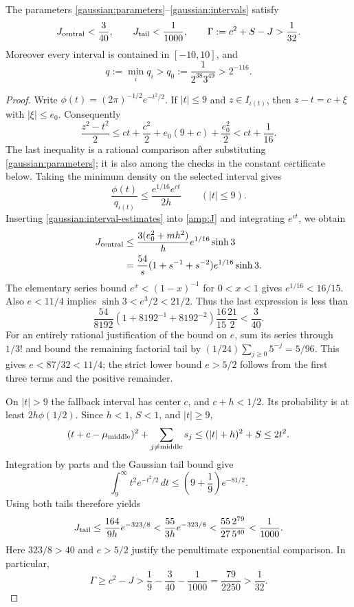 \begin{lemma}
\label{gaussian:gain}
The parameters \eqref{gaussian:parameters}--\eqref{gaussian:intervals}
satisfy
\begin{equation}
 J_{\rm central}<\frac3{40},\qquad
 J_{\rm tail}<\frac1{1000},\qquad
 \Gamma:=c^2+S-J>\frac1{32}.
 \label{gaussian:gain-bounds}
\end{equation}
Moreover every interval is contained in $[-10,10]$, and
\begin{equation}
 q:=\min_iq_i>
 q_0:=\frac1{2^{38}3^{49}}>2^{-116}.
 \label{gaussian:q-bound}
\end{equation}
\end{lemma}

\begin{proof}
Write $\phi(t)=(2\pi)^{-1/2}e^{-t^2/2}$.  If $|t|\le9$ and
$z\in I_{\iota(t)}$, then $z-t=c+\xi$ with $|\xi|\le e_0$.
Consequently
\[
 \frac{z^2-t^2}{2}
 \le ct+\frac{c^2}{2}+e_0(9+c)+\frac{e_0^2}{2}
 <ct+\frac1{16}.
\]
The last inequality is a rational comparison after substituting
\eqref{gaussian:parameters}; it is also among the checks in the
constant certificate below.  Taking the minimum density on the selected
interval gives
\begin{equation}
 \frac{\phi(t)}{q_{\iota(t)}}
 \le\frac{e^{1/16}e^{ct}}{2h}
 \qquad(|t|\le9).
 \label{gaussian:density-ratio}
\end{equation}
Inserting \eqref{gaussian:interval-estimates} into
\eqref{amp:J} and integrating $e^{ct}$, we obtain
\begin{align}
 J_{\rm central}
 &\le\frac{3(e_0^2+mh^2)}{h}e^{1/16}\sinh3\notag\\
 &=\frac{54}{s}(1+s^{-1}+s^{-2})e^{1/16}\sinh3.
 \label{gaussian:central}
\end{align}
The elementary series bound $e^x<(1-x)^{-1}$ for $0<x<1$
gives $e^{1/16}<16/15$.  Also $e<11/4$ implies
$\sinh3<e^3/2<21/2$.  Thus the last expression is less than
\[
 \frac{54}{8192}(1+8192^{-1}+8192^{-2})\frac{16}{15}\frac{21}{2}
 <\frac3{40}.
\]
For an entirely rational justification of the bound on $e$, sum its
series through $1/3!$ and bound the remaining factorial tail by
$(1/24)\sum_{j\ge0}5^{-j}=5/96$.  This gives
$e<87/32<11/4$; the strict lower bound $e>5/2$ follows from the
first three terms and the positive remainder.

On $|t|>9$ the fallback interval has center $c$, and
$c+h<1/2$.  Its probability is at least $2h\phi(1/2)$.
Since $h<1$, $S<1$, and $|t|\ge9$,
\[
 (t+c-\mu_{\rm middle})^2+\sum_{j\ne\rm middle}s_j
 \le(|t|+h)^2+S\le2t^2.
\]
Integration by parts and the Gaussian tail bound give
\[
 \int_9^\infty t^2e^{-t^2/2}\,dt
 \le\left(9+\frac19\right)e^{-81/2}.
\]
Using both tails therefore yields
\begin{equation}
 J_{\rm tail}\le\frac{164}{9h}e^{-323/8}
 <\frac{55}{3h}e^{-323/8}
 <\frac{55\,2^{79}}{27\,5^{40}}
 <\frac1{1000}.
 \label{gaussian:tail}
\end{equation}
Here $323/8>40$ and $e>5/2$ justify the penultimate exponential
comparison.  In particular,
\[
 \Gamma\ge c^2-J
 >\frac19-\frac3{40}-\frac1{1000}
 =\frac{79}{2250}>\frac1{32}.
\]


\end{proof}
